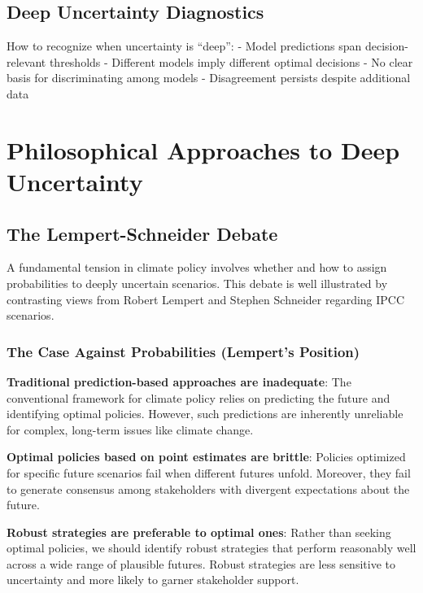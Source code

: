 \documentclass[
  letterpaper,
  DIV=11,
  numbers=noendperiod]{scrreprt}
\begin{document}
\subsection{Deep Uncertainty
Diagnostics}\label{deep-uncertainty-diagnostics}

How to recognize when uncertainty is ``deep'': - Model predictions span
decision-relevant thresholds - Different models imply different optimal
decisions - No clear basis for discriminating among models -
Disagreement persists despite additional data

\section{Philosophical Approaches to Deep
Uncertainty}\label{philosophical-approaches-to-deep-uncertainty}

\subsection{The Lempert-Schneider
Debate}\label{the-lempert-schneider-debate}

A fundamental tension in climate policy involves whether and how to
assign probabilities to deeply uncertain scenarios. This debate is well
illustrated by contrasting views from Robert Lempert and Stephen
Schneider regarding IPCC scenarios.

\subsubsection{The Case Against Probabilities (Lempert's
Position)}\label{the-case-against-probabilities-lemperts-position}

\textbf{Traditional prediction-based approaches are inadequate}: The
conventional framework for climate policy relies on predicting the
future and identifying optimal policies. However, such predictions are
inherently unreliable for complex, long-term issues like climate change.

\textbf{Optimal policies based on point estimates are brittle}: Policies
optimized for specific future scenarios fail when different futures
unfold. Moreover, they fail to generate consensus among stakeholders
with divergent expectations about the future.

\textbf{Robust strategies are preferable to optimal ones}: Rather than
seeking optimal policies, we should identify robust strategies that
perform reasonably well across a wide range of plausible futures. Robust
strategies are less sensitive to uncertainty and more likely to garner
stakeholder support.
\end{document}
